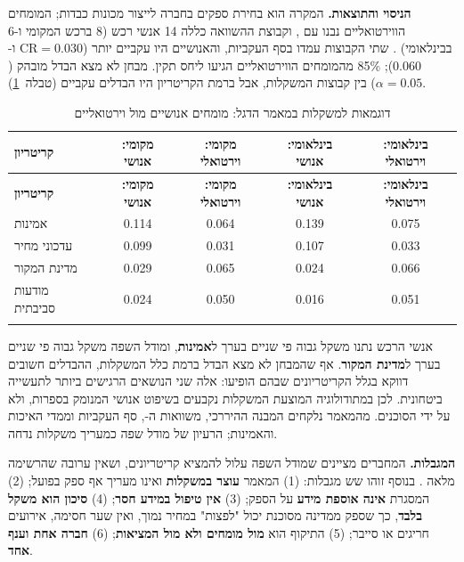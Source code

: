 \textbf{הניסוי והתוצאות.} המקרה הוא בחירת ספקים בחברה לייצור מכונות כבדות; המומחים הווירטואליים נבנו עם , וקבוצת ההשוואה כללה 14 אנשי רכש (8 ברכש המקומי ו-6 בבינלאומי) \cite{sadeghi2026}. שתי הקבוצות עמדו בסף העקביות, והאנושיים היו עקביים יותר ($\mathrm{CR}=0.030$ ו-$0.060$); 85\% מהמומחים הווירטואליים הגיעו ליחס תקין. מבחן  לא מצא הבדל מובהק ($\alpha=0.05$) בין קבוצות המשקלות, אבל ברמת הקריטריון היו הבדלים עקביים (טבלה~\ref{tab:sadeghi-results}).

{\small
\begin{longtable}{|>{\raggedright\arraybackslash}p{3.6cm}|c|c|c|c|}
\caption[דוגמאות למשקלות במאמר הדגל: מומחים אנושיים מול וירטואליים]{דוגמאות למשקלות במאמר הדגל: מומחים אנושיים מול וירטואליים \cite{sadeghi2026}}\label{tab:sadeghi-results}\\
\hline
\textbf{קריטריון} & \textbf{מקומי: אנושי} & \textbf{מקומי: וירטואלי} & \textbf{בינלאומי: אנושי} & \textbf{בינלאומי: וירטואלי} \\ \hline
\endfirsthead
\hline
\textbf{קריטריון} & \textbf{מקומי: אנושי} & \textbf{מקומי: וירטואלי} & \textbf{בינלאומי: אנושי} & \textbf{בינלאומי: וירטואלי} \\ \hline
\endhead
אמינות & 0.114 & 0.064 & 0.139 & 0.075 \\ \hline
עדכוני מחיר & 0.099 & 0.031 & 0.107 & 0.033 \\ \hline
מדינת המקור & 0.029 & 0.065 & 0.024 & 0.066 \\ \hline
מודעות סביבתית & 0.024 & 0.050 & 0.016 & 0.051 \\* \hline
\end{longtable}
}

אנשי הרכש נתנו משקל גבוה פי שניים בערך ל\textbf{אמינות}, ומודל השפה משקל גבוה פי שניים בערך ל\textbf{מדינת המקור}. אף שהמבחן לא מצא הבדל ברמת כלל המשקלות, ההבדלים חשובים דווקא בגלל הקריטריונים שבהם הופיעו: אלה שני הנושאים הרגישים ביותר לתעשייה ביטחונית. לכן במתודולוגיה המוצעת המשקלות נקבעים בשיפוט אנושי המנומק בספרות, ולא על ידי הסוכנים. מהמאמר נלקחים המבנה ההיררכי, משוואות ה-, סף העקביות וממדי האיכות והאמינות; הרעיון של מודל שפה כמעריך משקלות נדחה.

\textbf{המגבלות.} המחברים מציינים שמודל השפה עלול להמציא קריטריונים, ושאין ערובה שהרשימה מלאה \cite{sadeghi2026}. בנוסף זוהו שש מגבלות: (1) המאמר \textbf{עוצר במשקלות} ואינו מעריך אף ספק בפועל; (2) המסגרת \textbf{אינה אוספת מידע} על הספק; (3) \textbf{אין טיפול במידע חסר}; (4) \textbf{סיכון הוא משקל בלבד}, כך שספק ממדינה מסוכנת יכול "לפצות" במחיר נמוך, ואין שער חסימה, אירועים חריגים או סייבר; (5) התיקוף הוא \textbf{מול מומחים ולא מול המציאות}; (6) \textbf{חברה אחת וענף אחד}.

